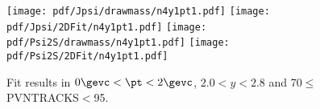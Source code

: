 \begin{figure}[H]
\begin{center}
\texttt{[image: pdf/Jpsi/drawmass/n4y1pt1.pdf]}
\texttt{[image: pdf/Jpsi/2DFit/n4y1pt1.pdf]}
\vspace*{-0.5cm}
\texttt{[image: pdf/Psi2S/drawmass/n4y1pt1.pdf]}
\texttt{[image: pdf/Psi2S/2DFit/n4y1pt1.pdf]}
\vspace*{-0.5cm}
\end{center}
\caption{Fit results in $0\gevc<\pt<2\gevc$, $2.0<y<2.8$ and 70$\leq$PVNTRACKS$<$95.}
\label{Fitn4y1pt1}
\end{figure}
